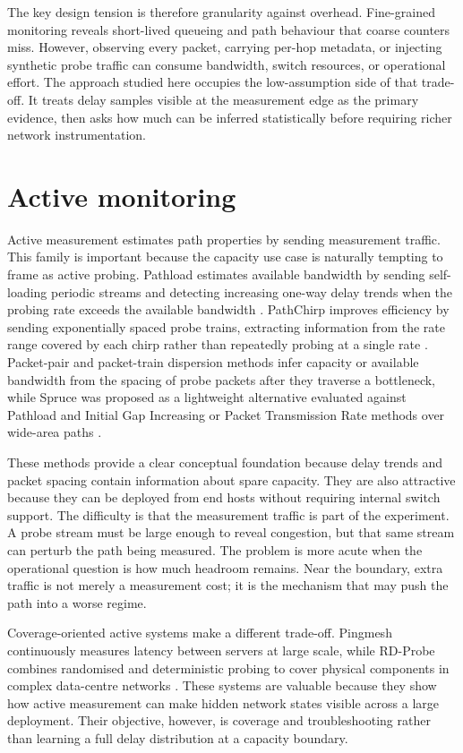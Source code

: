 The key design tension is therefore granularity against overhead. Fine-grained monitoring reveals short-lived queueing and path behaviour that coarse counters miss. However, observing every packet, carrying per-hop metadata, or injecting synthetic probe traffic can consume bandwidth, switch resources, or operational effort. The approach studied here occupies the low-assumption side of that trade-off. It treats delay samples visible at the measurement edge as the primary evidence, then asks how much can be inferred statistically before requiring richer network instrumentation.

\section{Active monitoring}

Active measurement estimates path properties by sending measurement traffic. This family is important because the capacity use case is naturally tempting to frame as active probing. Pathload estimates available bandwidth by sending self-loading periodic streams and detecting increasing one-way delay trends when the probing rate exceeds the available bandwidth \cite{jainDovrolisPathload}. PathChirp improves efficiency by sending exponentially spaced probe trains, extracting information from the rate range covered by each chirp rather than repeatedly probing at a single rate \cite{ribeiroPathchirp}. Packet-pair and packet-train dispersion methods infer capacity or available bandwidth from the spacing of probe packets after they traverse a bottleneck, while Spruce was proposed as a lightweight alternative evaluated against Pathload and Initial Gap Increasing or Packet Transmission Rate methods over wide-area paths \cite{dovrolisPacketDispersion,straussSpruce}.

These methods provide a clear conceptual foundation because delay trends and packet spacing contain information about spare capacity. They are also attractive because they can be deployed from end hosts without requiring internal switch support. The difficulty is that the measurement traffic is part of the experiment. A probe stream must be large enough to reveal congestion, but that same stream can perturb the path being measured. The problem is more acute when the operational question is how much headroom remains. Near the boundary, extra traffic is not merely a measurement cost; it is the mechanism that may push the path into a worse regime.

Coverage-oriented active systems make a different trade-off. Pingmesh continuously measures latency between servers at large scale, while RD-Probe combines randomised and deterministic probing to cover physical components in complex data-centre networks \cite{guoPingmesh,dingRdProbe}. These systems are valuable because they show how active measurement can make hidden network states visible across a large deployment. Their objective, however, is coverage and troubleshooting rather than learning a full delay distribution at a capacity boundary.

